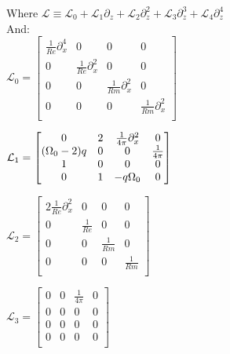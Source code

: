 \documentclass[letterpaper,12pt]{article}
\newcommand\reye{\mathrel{Re}}
\newcommand\reym{\mathrel{Rm}}
\begin{document}
Where $\mathcal{L} \equiv \mathcal{L}_0 + \mathcal{L}_1\partial_z + \mathcal{L}_2\partial_z^2 + \mathcal{L}_3\partial_z^3 + \mathcal{L}_4\partial_z^4$ \\

And: \\

$\mathcal{L}_0 = \left[\begin{matrix}
\frac{1}{\reye}\partial_x^4 & 0 & 0 & 0 \\
0 & \frac{1}{\reye}\partial_x^2 & 0 &0 \\
0 & 0 & \frac{1}{\reym}\partial_x^2 & 0 \\
0 & 0 & 0 & \frac{1}{\reym}\partial_x^2 \\ \end{matrix}\right] $ \\

\vspace{2mm}

$\mathcal{L}_1 = \left[\begin{matrix}
0 & 2 & \frac{1}{4\pi}\partial_x^2 & 0 \\
(\Omega_0 - 2)q & 0 & 0 & \frac{1}{4\pi} \\
1 & 0 & 0 & 0 \\
0 & 1 & -q\Omega_0 & 0 \\ \end{matrix}\right] \\$

\vspace{2mm}

$\mathcal{L}_2 = \left[\begin{matrix}
2\frac{1}{\reye} \partial_x^2 & 0 & 0 & 0 \\
0 & \frac{1}{\reye} & 0 & 0 \\
0 & 0 & \frac{1}{\reym} & 0 \\
0 & 0 & 0 & \frac{1}{\reym} \\ \end{matrix}\right]$

\vspace{2mm}

$\mathcal{L}_3 = \left[\begin{matrix}
0 & 0 & \frac{1}{4\pi} & 0 \\
0 & 0 & 0 & 0 \\
0 & 0 & 0 & 0 \\
0 & 0 & 0 & 0 \\ \end{matrix} \right] $

\vspace{2mm}
\end{document}
